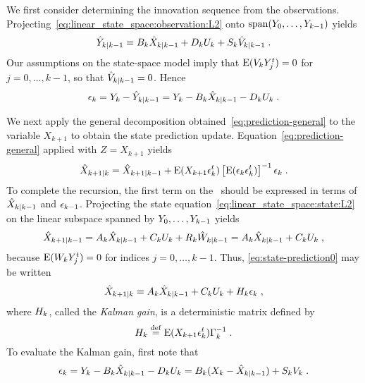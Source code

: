 We first consider determining the innovation sequence from the observations.
Projecting~\eqref{eq:linear_state_space:observation:L2} onto $\operatorname{span}(Y_0,
\ldots, Y_{k-1})$ yields
\begin{equation}
\label{eq:prediction-observation}
\hat{Y}_{k|k-1} = B_k \hat{X}_{k|k-1} + D_k U_k + S_k \hat{V}_{k|k-1} \; .
\end{equation}
Our assumptions on the state-space model imply that
$\operatorname{E}(V_k Y_j^t) = 0$ for $j=0,\dots,k-1$, so that $\hat{V}_{k|k-1}=0$. Hence
\begin{equation}
\label{eq:innovation}
\epsilon_k = Y_k - \hat{Y}_{k|k-1} = Y_k - B_k \hat{X}_{k|k-1} - D_k U_k\; .
\end{equation}

We next apply the general decomposition obtained~\eqref{eq:prediction-general}
to the variable $X_{k+1}$ to obtain the state prediction update.
Equation~\eqref{eq:prediction-general} applied with $Z=X_{k+1}$ yields
\begin{equation}
  \label{eq:state-prediction0}
  \hat{X}_{k+1|k} = \hat{X}_{k+1|k-1} + \operatorname{E}(X_{k+1} \epsilon_k^t) \left[ \operatorname{E}(\epsilon_k  \epsilon_k^t) \right]^{-1} \epsilon_k \;.
\end{equation}
To complete the recursion, the first term on the \rhs\ should be expressed in
terms of $\hat{X}_{k|k-1}$ and $\epsilon_{k-1}$. Projecting the state
equation~\eqref{eq:linear_state_space:state:L2} on the linear subspace
spanned by $Y_0, \ldots, Y_{k-1}$ yields
\begin{equation}
\label{eq:state-prediction}
\hat{X}_{k+1|k-1} = A_k \hat{X}_{k|k-1} + C_k U_k + R_k \hat{W}_{k|k-1}= A_k \hat{X}_{k|k-1} + C_k U_k\;,
\end{equation}
because $\operatorname{E}(W_k Y_j^t)= 0$ for indices $j=0, \ldots, k-1$.
Thus, \eqref{eq:state-prediction0} may be written
\begin{equation}
  \label{eq:predicted-state-estimator}
  \hat{X}_{k+1|k} = A_k \hat{X}_{k|k-1} + C_k U_k + H_{k} \epsilon_k \; ,
\end{equation}
where $H_{k}$,
called the  \textit{Kalman
  gain}, is a deterministic matrix defined by
\begin{equation}
  \label{eq:def:KGP}
  H_{k} \stackrel{\mathrm{def}}{=} \operatorname{E}(X_{k+1} \epsilon_k^t) \Gamma_k^{-1} \; .
\end{equation}
To evaluate the Kalman gain, first note that
\begin{equation}
\label{eq:expression-innovation}
\epsilon_k = Y_k - B_k \hat{X}_{k|k-1} - D_k U_k = B_k (X_k - \hat{X}_{k|k-1}) + S_k V_k \;.
\end{equation}
